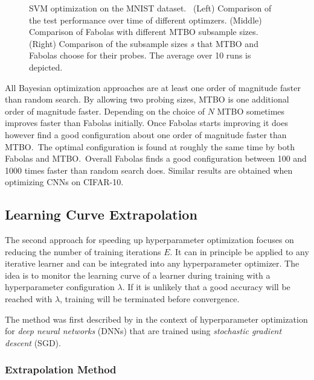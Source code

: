 \begin{figure}
\begin{subfigure}{0.34\textwidth}
	\end{subfigure}
	\caption{
		SVM optimization on the MNIST dataset.\
		(Left) Comparison of the test performance over time of different optimzers.
		(Middle) Comparison of Fabolas with different MTBO subsample sizes.
		(Right) Comparison of the subsample sizes \(s\) that MTBO and Fabolas choose for their probes.
		The average over 10 runs is depicted.
	}\label{fig:fabolas:eval}
\end{figure}
All Bayesian optimization approaches are at least one order of magnitude faster than random search.
By allowing two probing sizes, MTBO is one additional order of magnitude faster.
Depending on the choice of \(N\) MTBO sometimes improves faster than Fabolas initially.
Once Fabolas starts improving it does however find a good configuration about one order of magnitude faster than MTBO.\
The optimal configuration is found at roughly the same time by both Fabolas and MTBO.\
Overall Fabolas finds a good configuration between 100 and 1000 times faster than random search does.
Similar results are obtained when optimizing CNNs on CIFAR-10.

\subsection{Learning Curve Extrapolation}%
\label{sec:hyperparams:earlyterm}

The second approach for speeding up hyperparameter optimization focuses on reducing the number of training iterations \(E\).
It can in principle be applied to any iterative learner and can be integrated into any hyperparameter optimizer.
The idea is to monitor the learning curve of a learner during training with a hyperparameter configuration \(\lambda\).
If it is unlikely that a good accuracy will be reached with \(\lambda\), training will be terminated before convergence.

The method was first described by \citet{Domhan2015} in the context of hyperparameter optimization for \textit{deep neural networks} (DNNs) that are trained using \textit{stochastic gradient descent} (SGD).

\subsubsection{Extrapolation Method}%
\label{sec:hyperparams:earlyterm:method}

